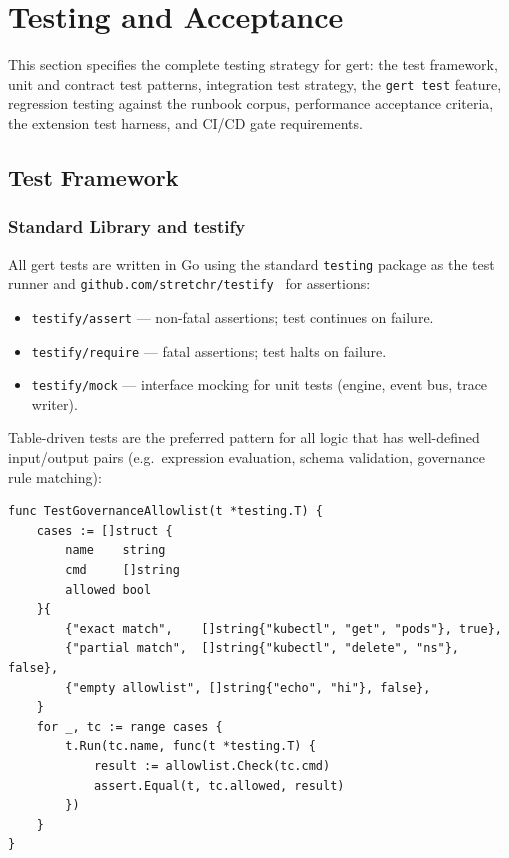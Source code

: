\chapter{Testing and Acceptance}
\label{ch:testing}

This section specifies the complete testing strategy for gert: the test framework, unit and contract test patterns, integration test strategy, the \texttt{gert test} feature, regression testing against the runbook corpus, performance acceptance criteria, the extension test harness, and CI/CD gate requirements.

\section{Test Framework}

\subsection{Standard Library and testify}

All gert tests are written in Go using the standard \texttt{testing} package as the test runner and \texttt{github.com/stretchr/testify}~\cite{testify-library} for assertions:

\begin{itemize}
  \item \texttt{testify/assert} — non-fatal assertions; test continues on failure.
  \item \texttt{testify/require} — fatal assertions; test halts on failure.
  \item \texttt{testify/mock} — interface mocking for unit tests (engine, event bus, trace writer).
\end{itemize}

Table-driven tests are the preferred pattern for all logic that has well-defined input/output pairs (e.g.\ expression evaluation, schema validation, governance rule matching):

\begin{verbatim}
func TestGovernanceAllowlist(t *testing.T) {
    cases := []struct {
        name    string
        cmd     []string
        allowed bool
    }{
        {"exact match",    []string{"kubectl", "get", "pods"}, true},
        {"partial match",  []string{"kubectl", "delete", "ns"}, false},
        {"empty allowlist", []string{"echo", "hi"}, false},
    }
    for _, tc := range cases {
        t.Run(tc.name, func(t *testing.T) {
            result := allowlist.Check(tc.cmd)
            assert.Equal(t, tc.allowed, result)
        })
    }
}
\end{verbatim}

